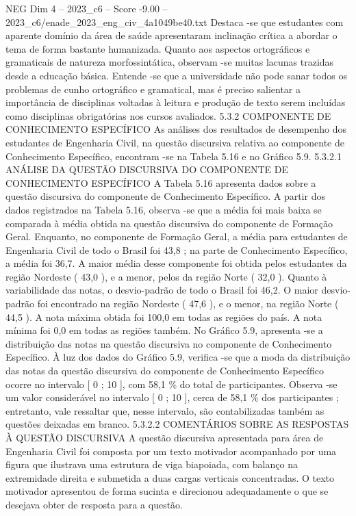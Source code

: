 \begin{textsample}{NEG Dim 4 – 2023\_c6 – Score -9.00 – 2023\_c6/enade\_2023\_eng\_civ\_4a1049be40.txt}
Destaca -se que estudantes com aparente domínio da área de saúde apresentaram inclinação crítica a abordar o tema de forma bastante humanizada.
Quanto aos aspectos ortográficos e gramaticais de natureza morfossintática, observam -se muitas lacunas trazidas desde a educação básica.
Entende -se que a universidade não pode sanar todos os problemas de cunho ortográfico e gramatical, mas é preciso salientar a importância de disciplinas voltadas à leitura e produção de texto serem incluídas como disciplinas obrigatórias nos cursos avaliados. 5.3.2 COMPONENTE DE CONHECIMENTO ESPECÍFICO As análises dos resultados de desempenho dos estudantes de Engenharia Civil, na questão discursiva relativa ao componente de Conhecimento Específico, encontram -se na Tabela 5.16 e no Gráfico 5.9. 5.3.2.1 ANÁLISE DA QUESTÃO DISCURSIVA DO COMPONENTE DE CONHECIMENTO ESPECÍFICO A Tabela 5.16 apresenta dados sobre a questão discursiva do componente de Conhecimento Específico.
A partir dos dados registrados na Tabela 5.16, observa -se que a média foi mais baixa se comparada à média obtida na questão discursiva do componente de Formação Geral.
Enquanto, no componente de Formação Geral, a média para estudantes de Engenharia Civil de todo o Brasil foi 43,8 ; na parte de Conhecimento Específico, a média foi 36,7.
A maior média desse componente foi obtida pelos estudantes da região Nordeste ( 43,0 ), e a menor, pelos da região Norte ( 32,0 ).
Quanto à variabilidade das notas, o desvio-padrão de todo o Brasil foi 46,2.
O maior desvio-padrão foi encontrado na região Nordeste ( 47,6 ), e o menor, na região Norte ( 44,5 ).
A nota máxima obtida foi 100,0 em todas as regiões do país.
A nota mínima foi 0,0 em todas as regiões também.
No Gráfico 5.9, apresenta -se a distribuição das notas na questão discursiva no componente de Conhecimento Específico.
À luz dos dados do Gráfico 5.9, verifica -se que a moda da distribuição das notas da questão discursiva do componente de Conhecimento Específico ocorre no intervalo [ 0 ; 10 ], com 58,1 \% do total de participantes.
Observa -se um valor considerável no intervalo [ 0 ; 10 ], cerca de 58,1 \% dos participantes ; entretanto, vale ressaltar que, nesse intervalo, são contabilizadas também as questões deixadas em branco. 5.3.2.2 COMENTÁRIOS SOBRE AS RESPOSTAS À QUESTÃO DISCURSIVA A questão discursiva apresentada para área de Engenharia Civil foi composta por um texto motivador acompanhado por uma figura que ilustrava uma estrutura de viga biapoiada, com balanço na extremidade direita e submetida a duas cargas verticais concentradas.
O texto motivador apresentou de forma sucinta e direcionou adequadamente o que se desejava obter de resposta para a questão.

\end{textsample}
